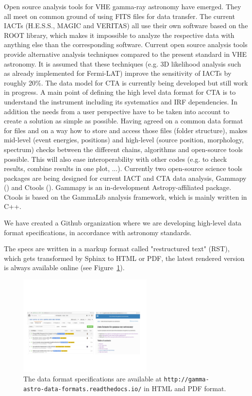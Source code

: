 Open source analysis tools for VHE gamma-ray astronomy have emerged. They all meet on common ground of using FITS files for data transfer. The current IACTs (H.E.S.S., MAGIC and VERITAS) all use their own software based on the ROOT library, which makes it impossible to analyze the respective data with anything else than the corresponding software. Current open source analysis tools provide alternative analysis techniques compared to the present standard in VHE astronomy. It is assumed that these techniques (e.g. 3D likelihood analysis such as already implemented for Fermi-LAT) improve the sensitivity of IACTs by roughly 20\%. The data model for CTA is currently being developed but still work in progress. A main point of defining the high level data format for CTA is to understand the instrument including its systematics and IRF dependencies. In addition the needs from a user perspective have to be taken into account to create a solution as simple as possible. Having agreed on a common data format for files and on a way how to store and access those files (folder structure), makes mid-level (event energies, positions) and high-level (source position, morphology, spectrum) checks between the different chains, algorithms and open-source tools possible. This will also ease interoperability with other codes (e.g. to check results, combine results in one plot, ...). Currently two open-source science tools packages are being designed for current IACT and CTA data analysis, Gammapy (\cite{2015arXiv150907408D}) and Ctools (\cite{2016AnA...593A...1K}). Gammapy is an in-development Astropy-affiliated package. Ctools is based on the GammaLib analysis framework, which is mainly written in C++.

We have created a Github organization where we are developing high-level data format specifications, in accordance with astronomy standards. 

The specs are written in a markup format called "restructured text" (RST),
which gets transformed by Sphinx to HTML or PDF, the latest rendered version is always available online (see Figure~\ref{fig:webpage}).

\begin{figure}[tb]
  \centerline{\includegraphics[width=0.6\textwidth]{figures/webpage}}
  \caption{The data format specifications are available at \texttt{http://gamma-astro-data-formats.readthedocs.io/} in HTML and PDF format.}
  \label{fig:webpage}
\end{figure}

